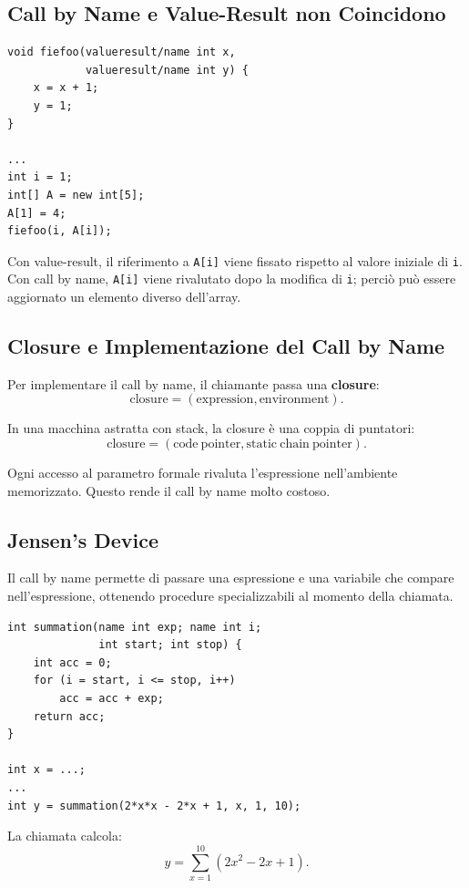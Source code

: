 \documentclass{article}
\begin{document}
\subsection{Call by Name e Value-Result non Coincidono}

\begin{lstlisting}
void fiefoo(valueresult/name int x,
            valueresult/name int y) {
    x = x + 1;
    y = 1;
}

...
int i = 1;
int[] A = new int[5];
A[1] = 4;
fiefoo(i, A[i]);
\end{lstlisting}

Con value-result, il riferimento a \texttt{A[i]} viene fissato rispetto al valore iniziale di \texttt{i}. Con call by name, \texttt{A[i]} viene rivalutato dopo la modifica di \texttt{i}; perciò può essere aggiornato un elemento diverso dell'array.

\subsection{Closure e Implementazione del Call by Name}

Per implementare il call by name, il chiamante passa una \textbf{closure}:
\[
\mathrm{closure} = (\mathrm{expression}, \mathrm{environment}).
\]

In una macchina astratta con stack, la closure è una coppia di puntatori:
\[
\mathrm{closure} = (\mathrm{code\ pointer}, \mathrm{static\ chain\ pointer}).
\]

Ogni accesso al parametro formale rivaluta l'espressione nell'ambiente memorizzato. Questo rende il call by name molto costoso.

\subsection{Jensen's Device}

Il call by name permette di passare una espressione e una variabile che compare nell'espressione, ottenendo procedure specializzabili al momento della chiamata.

\begin{lstlisting}
int summation(name int exp; name int i;
              int start; int stop) {
    int acc = 0;
    for (i = start, i <= stop, i++)
        acc = acc + exp;
    return acc;
}

int x = ...;
...
int y = summation(2*x*x - 2*x + 1, x, 1, 10);
\end{lstlisting}

La chiamata calcola:
\[
y = \sum_{x=1}^{10} (2x^2 - 2x + 1).
\]
\end{document}
